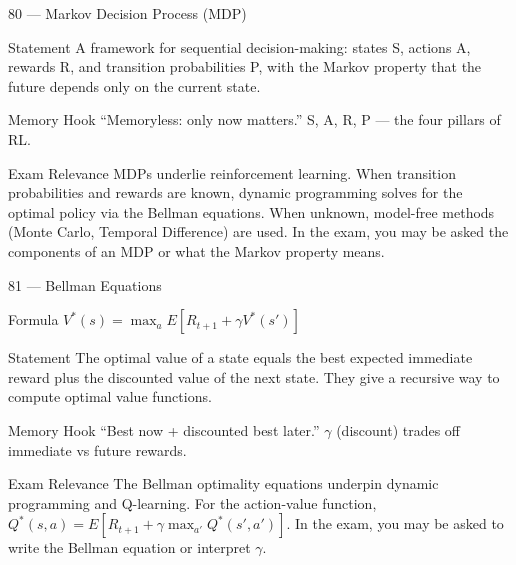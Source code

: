 \documentclass[aspectratio=169,8pt]{beamer}
\begin{document}
	\begin{frame}{80 --- Markov Decision Process (MDP)}
		\begin{block}{Statement}
			A framework for sequential decision-making: states S, actions A, rewards R, and transition probabilities P, with the Markov property that the future depends only on the current state.
		\end{block}
		\begin{block}{Memory Hook}
			``Memoryless: only now matters.'' S, A, R, P --- the four pillars of RL.
		\end{block}
		\begin{block}{Exam Relevance}
			MDPs underlie reinforcement learning. When transition probabilities and rewards are known, dynamic programming solves for the optimal policy via the Bellman equations. When unknown, model-free methods (Monte Carlo, Temporal Difference) are used. In the exam, you may be asked the components of an MDP or what the Markov property means.
		\end{block}
	\end{frame}
	
	\begin{frame}{81 --- Bellman Equations}
		\begin{block}{Formula}
			$V^*(s) = \max_a E[R_{t+1} + \gamma V^*(s')]$
		\end{block}
		\begin{block}{Statement}
			The optimal value of a state equals the best expected immediate reward plus the discounted value of the next state. They give a recursive way to compute optimal value functions.
		\end{block}
		\begin{block}{Memory Hook}
			``Best now + discounted best later.'' $\gamma$ (discount) trades off immediate vs future rewards.
		\end{block}
		\begin{block}{Exam Relevance}
			The Bellman optimality equations underpin dynamic programming and Q-learning. For the action-value function, $Q^*(s,a) = E[R_{t+1} + \gamma \max_{a'} Q^*(s',a')]$. In the exam, you may be asked to write the Bellman equation or interpret $\gamma$.
		\end{block}
	\end{frame}
	
\end{document}
